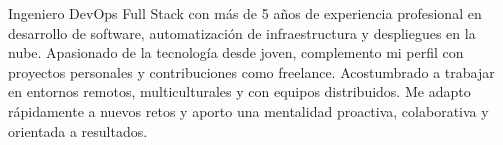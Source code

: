 

\begin{cvparagraph}

Ingeniero DevOps Full Stack con más de 5 años de experiencia profesional en desarrollo de software, automatización de infraestructura y despliegues en la nube. Apasionado de la tecnología desde joven, complemento mi perfil con proyectos personales y contribuciones como freelance. Acostumbrado a trabajar en entornos remotos, multiculturales y con equipos distribuidos. Me adapto rápidamente a nuevos retos y aporto una mentalidad proactiva, colaborativa y orientada a resultados.
\end{cvparagraph}